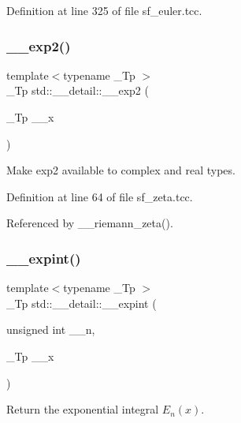 Definition at line 325 of file sf\+\_\+euler.\+tcc.

\mbox{\label{namespacestd_1_1____detail_a51c70764063ef329a4ab96f837c99faf}} 
\subsubsection{\texorpdfstring{\+\_\+\+\_\+exp2()}{\_\_exp2()}}
{\footnotesize\ttfamily template$<$typename \+\_\+\+Tp $>$ \\
\+\_\+\+Tp std\+::\+\_\+\+\_\+detail\+::\+\_\+\+\_\+exp2 (\begin{DoxyParamCaption}\item[{\+\_\+\+Tp}]{\+\_\+\+\_\+x }\end{DoxyParamCaption})}

Make exp2 available to complex and real types. 

Definition at line 64 of file sf\+\_\+zeta.\+tcc.



Referenced by \+\_\+\+\_\+riemann\+\_\+zeta().

\mbox{\label{namespacestd_1_1____detail_a0282700710ec07b8ca095fe2ec140d6e}} 
\subsubsection{\texorpdfstring{\+\_\+\+\_\+expint()}{\_\_expint()}\hspace{0.1cm}{\footnotesize\ttfamily [1/2]}}
{\footnotesize\ttfamily template$<$typename \+\_\+\+Tp $>$ \\
\+\_\+\+Tp std\+::\+\_\+\+\_\+detail\+::\+\_\+\+\_\+expint (\begin{DoxyParamCaption}\item[{unsigned int}]{\+\_\+\+\_\+n,  }\item[{\+\_\+\+Tp}]{\+\_\+\+\_\+x }\end{DoxyParamCaption})}



Return the exponential integral $ E_n(x) $. 

